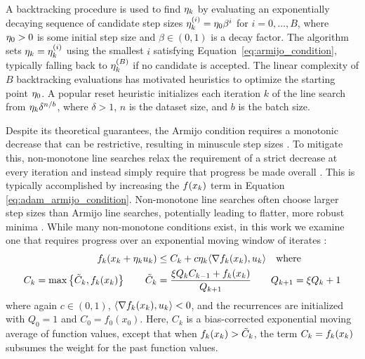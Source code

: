   A backtracking procedure is used to find $\eta_{k}$ by evaluating an exponentially decaying sequence of candidate step sizes $\eta_{k}^{(i)} = \eta_0 \beta^i$ for $i = 0, \dots, B$, where $\eta_0 > 0$ is some initial step size and $\beta \in (0, 1)$ is a decay factor. The algorithm sets $\eta_{k} = \eta_{k}^{(i)}$ using the smallest $i$ satisfying Equation~\eqref{eq:armijo_condition}, typically falling back to $\eta_{k}^{(B)}$ if no candidate is accepted. The linear complexity of $B$ backtracking evaluations has motivated heuristics to optimize the starting point $\eta_0$. A popular reset heuristic \cite{vaswani2019painless} initializes each iteration $k$ of the line search from $\eta_{k} \delta^{n/b}$, where $\delta > 1$, $n$ is the dataset size, and $b$ is the batch size.
  
  Despite its theoretical guarantees, the Armijo condition requires a monotonic decrease that can be restrictive, resulting in minuscule step sizes \cite{nocedal2006numerical}.
  To mitigate this, non-monotone line searches relax the requirement of a strict decrease at every iteration and instead simply require that progress be made overall
  \cite{zhang2004nonmonotone,galli2023monotone,fox2024nonmonotone,grippo1986nonmonotone,dai2002nonmonotone,huynh1993nonmonotone,ernesto2000nonmonotone}. This is typically accomplished by increasing the $f(x_{k})$ term in
  Equation \ref{eq:adam_armijo_condition}. Non-monotone line searches often choose larger step sizes than Armijo line searches, potentially leading to flatter, more robust minima \cite{fox2024nonmonotone}.
  While many non-monotone conditions exist, in this work we examine one that requires progress over an exponential moving window of iterates \cite{zhang2004nonmonotone,galli2023monotone}:
  \begin{equation}
      \begin{split}
          f_k(x_{k} + \eta_{k} u_{k}) &\le C_k + c \eta_{k} \langle \nabla f_k(x_{k}), u_{k} \rangle
          \quad \text{where} \\
              C_k = \max \left\{ \tilde C_k, f_k(x_k) \right\} \qquad
              \tilde C_k &= \frac{\xi Q_k C_{k-1} + f_k(x_k)}{Q_{k+1}} \qquad
              Q_{k + 1} = \xi Q_k + 1
      \end{split}
      \label{eq:nonmonotone_condition}
  \end{equation}
  where again $c \in (0, 1)$, $\langle \nabla f_k(x_{k}), u_{k} \rangle < 0$, and the recurrences are initialized with $Q_0 = 1$ and $C_0 = f_0(x_0)$. Here, $C_k$ is a bias-corrected exponential moving average of function values, except that when $f_k(x_{k}) > \tilde C_k$, the term $C_k = f_k(x_{k})$ subsumes the weight for the past function values.
  
